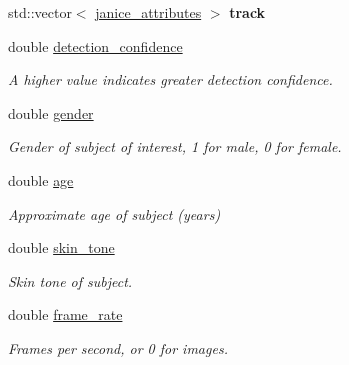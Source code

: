 \begin{DoxyCompactItemize}
\item 
\hypertarget{structjanice__track_a6c9f08e70df21f2809fd41fe06c097c5}{}std\+::vector$<$ \hyperlink{structjanice__attributes}{janice\+\_\+attributes} $>$ {\bfseries track}\label{structjanice__track_a6c9f08e70df21f2809fd41fe06c097c5}

\item 
\hypertarget{structjanice__track_aae1aa3523734782e6d69169201defa08}{}double \hyperlink{structjanice__track_aae1aa3523734782e6d69169201defa08}{detection\+\_\+confidence}\label{structjanice__track_aae1aa3523734782e6d69169201defa08}

\begin{DoxyCompactList}\small\item\em A higher value indicates greater detection confidence. \end{DoxyCompactList}\item 
\hypertarget{structjanice__track_ad41665244a5be3c5826cade1ee781eab}{}double \hyperlink{structjanice__track_ad41665244a5be3c5826cade1ee781eab}{gender}\label{structjanice__track_ad41665244a5be3c5826cade1ee781eab}

\begin{DoxyCompactList}\small\item\em Gender of subject of interest, 1 for male, 0 for female. \end{DoxyCompactList}\item 
double \hyperlink{structjanice__track_aa5d7b3e46bff9565b07dfcaa5cc1a90f}{age}
\begin{DoxyCompactList}\small\item\em Approximate age of subject (years) \end{DoxyCompactList}\item 
double \hyperlink{structjanice__track_a0dd3c201c19faa0d711f698266f23eda}{skin\+\_\+tone}
\begin{DoxyCompactList}\small\item\em Skin tone of subject. \end{DoxyCompactList}\item 
\hypertarget{structjanice__track_a3343263ed6ce3a26ca010d3d43989e2d}{}double \hyperlink{structjanice__track_a3343263ed6ce3a26ca010d3d43989e2d}{frame\+\_\+rate}\label{structjanice__track_a3343263ed6ce3a26ca010d3d43989e2d}

\begin{DoxyCompactList}\small\item\em Frames per second, or 0 for images. \end{DoxyCompactList}\end{DoxyCompactItemize}


